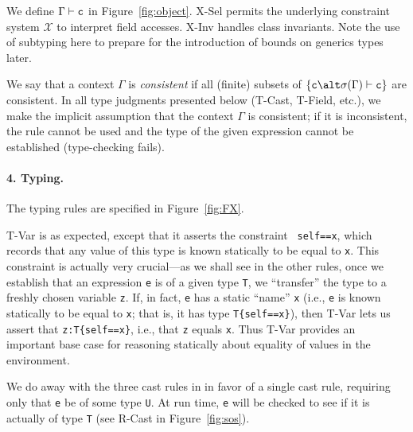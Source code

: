 We define $\Gamma\vdash {\tt c}$ in Figure~\ref{fig:object}. {\sc X-Sel} permits the underlying constraint system $\mathcal{X}$ to interpret field accesses. {\sc X-Inv} handles class invariants. Note the use of subtyping here to prepare for the introduction of bounds on generics types later.

We say that a context $\Gamma$ is {\em consistent} if all (finite)
subsets of $\{{\tt c}\alt \sigma(\Gamma) \vdash {\tt c}\}$ are consistent.
In all type judgments presented below ({\sc T-Cast}, {\sc T-Field},
etc.), we make the implicit assumption that the context $\Gamma$ is
consistent; if it is inconsistent, the rule cannot be used and the
type of the given expression cannot be established (type-checking
fails).


\paragraph{4. Typing.} The typing rules are specified in Figure~\ref{fig:FX}.

{\sc T-Var} is as expected, except that it asserts the constraint {\tt
self==x}, which records that any value of this type is known
statically to be equal to {\tt x}. This constraint is actually very
crucial---as we shall see in the other rules, once we establish that
an expression {\tt e} is of a given type {\tt T}, we ``transfer'' the
type to a freshly chosen variable {\tt z}.  If, in fact, {\tt e} has a
static ``name'' {\tt x} (i.e., {\tt e} is known statically to be
equal to {\tt x}; that is, it has type {\tt T\{self==x\}}), then
{\sc T-Var} lets us assert that {\tt z:T\{self==x\}}, i.e., that {\tt z}
equals {\tt x}.
Thus {\sc T-Var} provides an important base case for
reasoning statically about equality of values in the environment.

We do away with the three cast rules in \FJ{} in favor of a single
cast rule, requiring only that {\tt e} be of some type {\tt U}.  At run time,
{\tt e} will be checked to see if it is actually of type {\tt T} (see
{\sc R-Cast} in Figure~\ref{fig:sos}).


